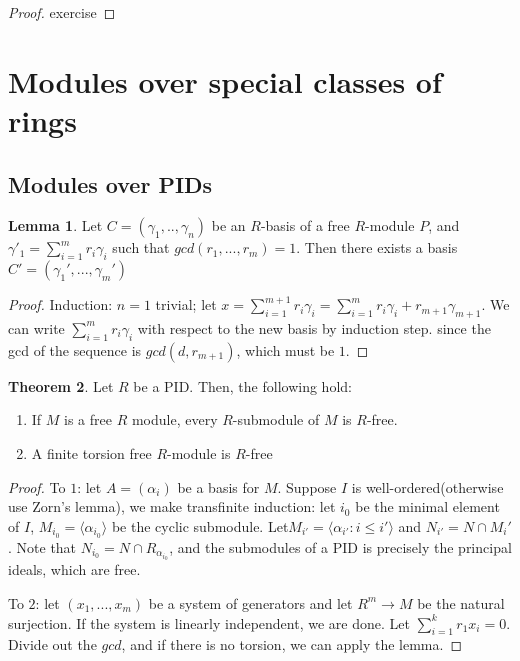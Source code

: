 \documentclass{article}
\theoremstyle{definition}
\newtheorem{theorem}{Theorem}[section]
\theoremstyle{definition}
\theoremstyle{definition}
\theoremstyle{definition}
\newtheorem{lemma}[theorem]{Lemma}
\theoremstyle{definition}
\theoremstyle{definition}
\theoremstyle{definition}
\begin{document}
\begin{proof}
    exercise
\end{proof}

\section{Modules over special classes of rings}
\subsection{Modules over PIDs}


\begin{tcolorbox}
\begin{lemma}
Let $C=(\gamma_1,..,\gamma_n)$ be an $R$-basis of a free $R$-module $P$, and $\gamma'_1= \sum_{i=1}^{m}r_i\gamma_i$ such that $gcd(r_1,...,r_m)=1$. Then there exists a basis $C'=(\gamma_1',...,\gamma_m')$
\end{lemma}
\end{tcolorbox}
\begin{proof}
    Induction: $n=1$ trivial; let $x=\sum_{i=1}^{m+1}r_i\gamma_i=\sum_{i=1}^{m}r_i\gamma_i+r_{m+1}\gamma_{m+1}$. We can write $\sum_{i=1}^{m}r_i\gamma_i$ with respect to the new basis by induction step. since the gcd of the sequence is $gcd(d,r_{m+1})$, which must be $1$. 
\end{proof}

\begin{tcolorbox}[colback=red!5!white,colframe=red!30!white]
\begin{theorem}
Let $R$ be a PID. Then, the following hold:
\begin{enumerate}
    \item If $M$ is a free $R$ module, every $R$-submodule of $M$ is $R$-free. 
    \item  A finite torsion free $R$-module is $R$-free
\end{enumerate}
\end{theorem}
\end{tcolorbox}
\begin{proof}
    To $1$: let $A=(\alpha_i)$ be a basis for $M$. Suppose $I$ is well-ordered(otherwise use Zorn's lemma), we make transfinite induction: let $i_0$ be the minimal element of $I$, $M_{i_0}=\langle \alpha_{i_0} \rangle$ be the cyclic submodule. Let$M_{i'}=\langle \alpha_{i'}: i\leq i'  \rangle$ and $N_{i'}=N\cap M_i'$. Note that $N_{i_0}=N\cap R_{\alpha_{i_0}}$, and the submodules of a PID is precisely the principal ideals, which are free. 

    To $2$: let $(x_1,...,x_m)$ be a system of generators and let $R^m\to M$ be the natural surjection. If the system is linearly independent, we are done. Let $\sum_{i=1}^{k}r_1x_i=0$. Divide out the $gcd$, and if there is no torsion, we can apply the lemma. 
\end{proof}
\end{document}
